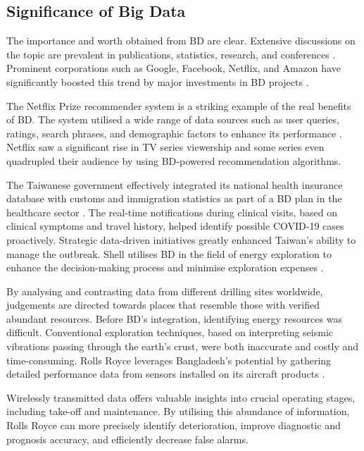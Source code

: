 \documentclass[journal]{IEEEtran}
\begin{document}
\subsection{Significance of Big Data}\label{sec:The Value of Big Data} 

The importance and worth obtained from BD are clear. Extensive discussions on the topic are prevalent in publications, statistics, research, and conferences \cite{Chen2012,ataei2023towards}. Prominent corporations such as Google, Facebook, Netflix, and Amazon have significantly boosted this trend by major investments in BD projects \cite{AtaeiHype}. 

The Netflix Prize recommender system is a striking example of the real benefits of BD. The system utilised a wide range of data sources such as user queries, ratings, search phrases, and demographic factors to enhance its performance \cite{Amatriain2013}. Netflix saw a significant rise in TV series viewership and some series even quadrupled their audience by using BD-powered recommendation algorithms. 

The Taiwanese government effectively integrated its national health insurance database with customs and immigration statistics as part of a BD plan in the healthcare sector \cite{wang2020response}. The real-time notifications during clinical visits, based on clinical symptoms and travel history, helped identify possible COVID-19 cases proactively. Strategic data-driven initiatives greatly enhanced Taiwan's ability to manage the outbreak. Shell utilises BD in the field of energy exploration to enhance the decision-making process and minimise exploration expenses \cite{Marr2016}. 

By analysing and contrasting data from different drilling sites worldwide, judgements are directed towards places that resemble those with verified abundant resources. Before BD's integration, identifying energy resources was difficult. Conventional exploration techniques, based on interpreting seismic vibrations passing through the earth's crust, were both inaccurate and costly and time-consuming. Rolls Royce leverages Bangladesh's potential by gathering detailed performance data from sensors installed on its aircraft products \cite{rad2017big}. 

Wirelessly transmitted data offers valuable insights into crucial operating stages, including take-off and maintenance. By utilising this abundance of information, Rolls Royce can more precisely identify deterioration, improve diagnostic and prognosis accuracy, and efficiently decrease false alarms. 
\end{document}
